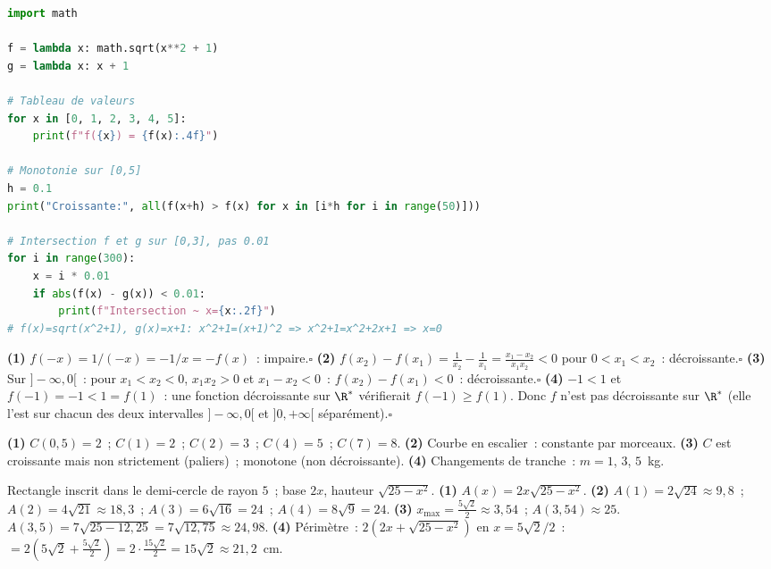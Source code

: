 
\begin{lstlisting}[language=Python]
import math

f = lambda x: math.sqrt(x**2 + 1)
g = lambda x: x + 1

# Tableau de valeurs
for x in [0, 1, 2, 3, 4, 5]:
    print(f"f({x}) = {f(x):.4f}")

# Monotonie sur [0,5]
h = 0.1
print("Croissante:", all(f(x+h) > f(x) for x in [i*h for i in range(50)]))

# Intersection f et g sur [0,3], pas 0.01
for i in range(300):
    x = i * 0.01
    if abs(f(x) - g(x)) < 0.01:
        print(f"Intersection ~ x={x:.2f}")
# f(x)=sqrt(x^2+1), g(x)=x+1: x^2+1=(x+1)^2 => x^2+1=x^2+2x+1 => x=0
\end{lstlisting}


\textbf{(1)} $f(-x)=1/(-x)=-1/x=-f(x)$~: impaire.\hfill$\square$
\textbf{(2)} $f(x_2)-f(x_1)=\frac{1}{x_2}-\frac{1}{x_1}=\frac{x_1-x_2}{x_1x_2}<0$ pour $0<x_1<x_2$~: d\'ecroissante.\hfill$\square$
\textbf{(3)} Sur $]-\infty,0[$~: pour $x_1<x_2<0$, $x_1x_2>0$ et $x_1-x_2<0$~:
$f(x_2)-f(x_1)<0$~: d\'ecroissante.\hfill$\square$
\textbf{(4)} $-1<1$ et $f(-1)=-1<1=f(1)$~: une fonction d\'ecroissante sur $\R^*$ v\'erifierait $f(-1)\ge f(1)$.
Donc $f$ n'est pas d\'ecroissante sur $\R^*$ (elle l'est sur chacun des deux intervalles $]-\infty,0[$ et $]0,+\infty[$ s\'epar\'ement).\hfill$\square$


\textbf{(1)} $C(0{,}5)=2$~; $C(1)=2$~; $C(2)=3$~; $C(4)=5$~; $C(7)=8$.
\textbf{(2)} Courbe en escalier~: constante par morceaux.
\textbf{(3)} $C$ est croissante mais non strictement (paliers)~; monotone (non d\'ecroissante).
\textbf{(4)} Changements de tranche~: $m=1$, $3$, $5$~kg.


Rectangle inscrit dans le demi-cercle de rayon $5$~; base $2x$, hauteur $\sqrt{25-x^2}$.
\textbf{(1)} $A(x)=2x\sqrt{25-x^2}$.
\textbf{(2)} $A(1)=2\sqrt{24}\approx9{,}8$~; $A(2)=4\sqrt{21}\approx18{,}3$~;
$A(3)=6\sqrt{16}=24$~; $A(4)=8\sqrt{9}=24$.
\textbf{(3)} $x_{\max}=\frac{5\sqrt{2}}{2}\approx3{,}54$~; $A(3{,}54)\approx25$.
$A(3{,}5)=7\sqrt{25-12{,}25}=7\sqrt{12{,}75}\approx24{,}98$.\checkmark
\textbf{(4)} P\'erim\`etre~: $2(2x+\sqrt{25-x^2})$ en $x=5\sqrt{2}/2$~:
$=2(5\sqrt{2}+\frac{5\sqrt{2}}{2})=2\cdot\frac{15\sqrt{2}}{2}=15\sqrt{2}\approx21{,}2$~cm.

